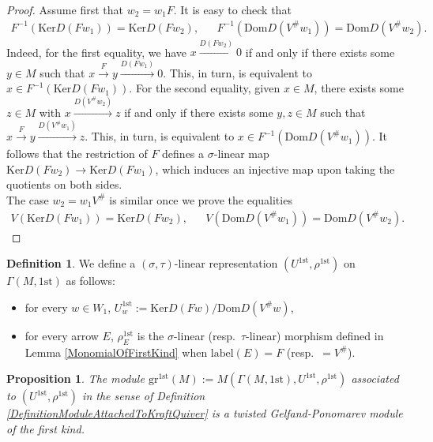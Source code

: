 \documentclass[12pt]{amsart}
\newtheorem{proposition}[theorem]{Proposition}
\theoremstyle{definition}
\newtheorem{definition}[theorem]{Definition}
\newcommand{\<}{\langle}   %
\renewcommand{\>}{\rangle} %
\begin{document}
\begin{proof}
    Assume first that $w_2 = w_1F$. It is easy to check that 
    \begin{align*}
        F^{-1}(\mathrm{Ker}D(Fw_1)) = \mathrm{Ker}D(Fw_2), & & F^{-1}(\mathrm{Dom}D(V^{\#}w_1)) = \mathrm{Dom}D(V^{\#}w_2).
    \end{align*}
    Indeed, for the first equality, we have $x \xrightarrow{D(Fw_2)} 0$ if and only if there exists some $y \in M$ such that $x \xrightarrow{F} y \xrightarrow{D(Fw_1)} 0$. This, in turn, is equivalent to $x \in F^{-1}(\mathrm{Ker}D(Fw_1))$. For the second equality, given $x \in M$, there exists some $z \in M$ with $x \xrightarrow{D(V^{\#}w_2)} z$ if and only if there exists some $y, z \in M$ such that $x \xrightarrow{F} y \xrightarrow{D(V^{\#}w_1)} z$. This, in turn, is equivalent to $x \in F^{-1}(\mathrm{Dom}D(V^{\#}w_1))$. It follows that the restriction of $F$ defines a $\sigma$-linear map $\mathrm{Ker}D(Fw_2) \rightarrow \mathrm{Ker}D(Fw_1)$, which induces an injective map upon taking the quotients on both sides.\\
    The case $w_2 = w_1V^{\#}$ is similar once we prove the equalities
    \begin{align*}
        V(\mathrm{Ker}D(Fw_1)) = \mathrm{Ker}D(Fw_2), & & V(\mathrm{Dom}D(V^{\#}w_1)) = \mathrm{Dom}D(V^{\#}w_2).
    \end{align*}
\end{proof}

\begin{definition}\label{DefinitionRepnFirstKind}
    We define a $(\sigma,\tau)$-linear representation $(U^{1\mathrm{st}},\rho^{1\mathrm{st}})$ on $\Gamma(M,1\mathrm{st})$ as follows:
    \begin{itemize}
        \item for every $w \in W_1$, $U^{1\mathrm{st}}_w := \mathrm{Ker}D(Fw)/\mathrm{Dom}D(V^{\#}w)$,
        \item for every arrow $E$, $\rho^{1\mathrm{st}}_E$ is the $\sigma$-linear (resp.~$\tau$-linear) morphism defined in Lemma \ref{MonomialOfFirstKind} when $\mathrm{label}(E) = F$ (resp.~$= V^{\#}$).
    \end{itemize}
\end{definition}

\begin{proposition}\label{Gr1stIsOfTheFirstKind}
    The module $\mathrm{gr}^{1\mathrm{st}}(M) := M(\Gamma(M,1\mathrm{st}),U^{1\mathrm{st}},\rho^{1\mathrm{st}})$ associated to $(U^{1\mathrm{st}},\rho^{1\mathrm{st}})$ in the sense of Definition \ref{DefinitionModuleAttachedToKraftQuiver} is a twisted Gelfand-Ponomarev module of the first kind.
\end{proposition}
\end{document}
